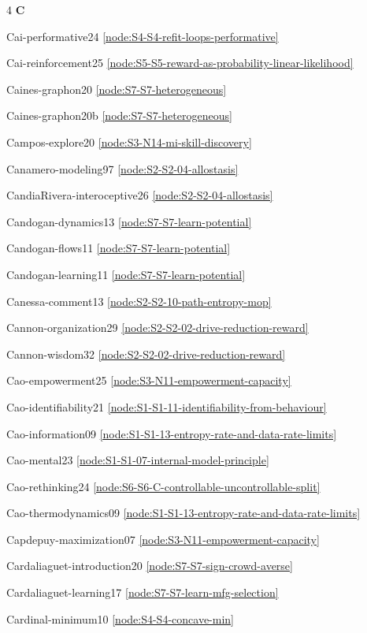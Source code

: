 \documentclass[10pt]{article}
\begin{document}
{\begin{multicols}{4}
\smallskip\textbf{C}\par
Cai-performative24 \hfill \ref{node:S4-S4-refit-loops-performative}\par
Cai-reinforcement25 \hfill \ref{node:S5-S5-reward-as-probability-linear-likelihood}\par
Caines-graphon20 \hfill \ref{node:S7-S7-heterogeneous}\par
Caines-graphon20b \hfill \ref{node:S7-S7-heterogeneous}\par
Campos-explore20 \hfill \ref{node:S3-N14-mi-skill-discovery}\par
Canamero-modeling97 \hfill \ref{node:S2-S2-04-allostasis}\par
CandiaRivera-interoceptive26 \hfill \ref{node:S2-S2-04-allostasis}\par
Candogan-dynamics13 \hfill \ref{node:S7-S7-learn-potential}\par
Candogan-flows11 \hfill \ref{node:S7-S7-learn-potential}\par
Candogan-learning11 \hfill \ref{node:S7-S7-learn-potential}\par
Canessa-comment13 \hfill \ref{node:S2-S2-10-path-entropy-mop}\par
Cannon-organization29 \hfill \ref{node:S2-S2-02-drive-reduction-reward}\par
Cannon-wisdom32 \hfill \ref{node:S2-S2-02-drive-reduction-reward}\par
Cao-empowerment25 \hfill \ref{node:S3-N11-empowerment-capacity}\par
Cao-identifiability21 \hfill \ref{node:S1-S1-11-identifiability-from-behaviour}\par
Cao-information09 \hfill \ref{node:S1-S1-13-entropy-rate-and-data-rate-limits}\par
Cao-mental23 \hfill \ref{node:S1-S1-07-internal-model-principle}\par
Cao-rethinking24 \hfill \ref{node:S6-S6-C-controllable-uncontrollable-split}\par
Cao-thermodynamics09 \hfill \ref{node:S1-S1-13-entropy-rate-and-data-rate-limits}\par
Capdepuy-maximization07 \hfill \ref{node:S3-N11-empowerment-capacity}\par
Cardaliaguet-introduction20 \hfill \ref{node:S7-S7-sign-crowd-averse}\par
Cardaliaguet-learning17 \hfill \ref{node:S7-S7-learn-mfg-selection}\par
Cardinal-minimum10 \hfill \ref{node:S4-S4-concave-min}\par

\end{multicols}}
\end{document}
